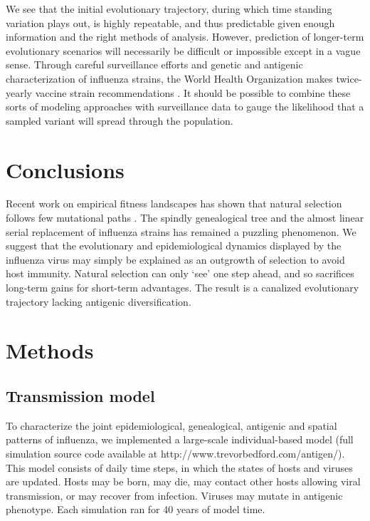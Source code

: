 \documentclass[11pt,oneside,letterpaper]{article}
\begin{document}
We see that the initial evolutionary trajectory, during which time standing variation plays out, is highly repeatable, and thus predictable given enough information and the right methods of analysis.  However, prediction of longer-term evolutionary scenarios will necessarily be difficult or impossible except in a vague sense.    Through careful surveillance efforts and genetic and antigenic characterization of influenza strains, the World Health Organization makes twice-yearly vaccine strain recommendations \cite{Barr10}.  It should be possible to combine these sorts of modeling approaches with surveillance data to gauge the likelihood that a sampled variant will spread through the population.

\section*{Conclusions}

Recent work on empirical fitness landscapes has shown that natural selection follows few mutational paths \cite{Weinreich06}.  The spindly genealogical tree and the almost linear serial replacement of influenza strains has remained a puzzling phenomenon.  We suggest that the evolutionary and epidemiological dynamics displayed by the influenza virus may simply be explained as an outgrowth of selection to avoid host immunity.  Natural selection can only `see' one step ahead, and so sacrifices long-term gains for short-term advantages.  The result is a canalized evolutionary trajectory lacking antigenic diversification.

\section*{Methods}

\subsection*{Transmission model}

To characterize the joint epidemiological, genealogical, antigenic and spatial patterns of influenza, we implemented a large-scale individual-based model (full simulation source code available at http://www.trevorbedford.com/antigen/).  This model consists of daily time steps, in which the states of hosts and viruses are updated.  Hosts may be born, may die, may contact other hosts allowing viral transmission, or may recover from infection.  Viruses may mutate in antigenic phenotype.  Each simulation ran for 40 years of model time.  
\end{document}
